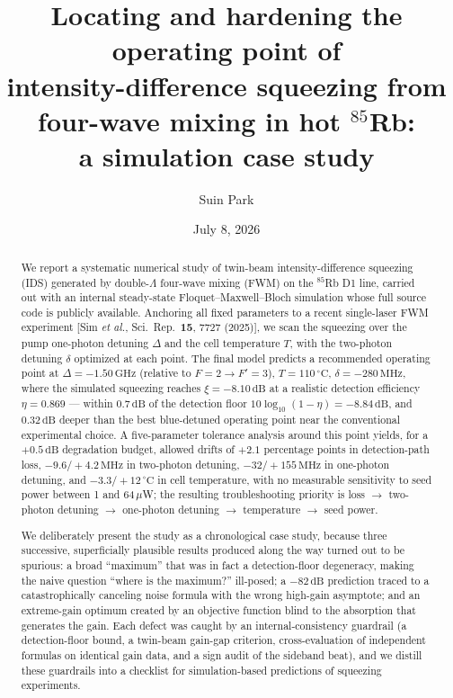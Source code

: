 \documentclass[11pt,a4paper]{article}
\title{\textbf{Locating and hardening the operating point of\\
intensity-difference squeezing from four-wave mixing in hot $^{85}$Rb:\\
a simulation case study}}
\author{Suin Park}
\date{July 8, 2026}
\newcommand{\dB}{\,\mathrm{dB}}
\newcommand{\GHz}{\,\mathrm{GHz}}
\newcommand{\MHz}{\,\mathrm{MHz}}
\newcommand{\degC}{\,^{\circ}\mathrm{C}}
\newcommand{\Rb}{$^{85}$Rb}
\begin{document}
\maketitle

\begin{abstract}
\noindent
We report a systematic numerical study of twin-beam intensity-difference
squeezing (IDS) generated by double-$\Lambda$ four-wave mixing (FWM) on the
\Rb{} D1 line, carried out with an internal steady-state Floquet--Maxwell--Bloch
simulation whose full source code is publicly available.
Anchoring all fixed parameters to a recent single-laser FWM experiment
[Sim \emph{et al.}, Sci.\ Rep.\ \textbf{15}, 7727 (2025)], we scan the
squeezing over the pump one-photon detuning $\Delta$ and the cell temperature
$T$, with the two-photon detuning $\delta$ optimized at each point. The final
model predicts a recommended operating point at
$\Delta=-1.50\GHz$ (relative to $F{=}2\to F'{=}3$), $T=110\degC$,
$\delta=-280\MHz$, where the simulated squeezing reaches $\xi=-8.10\dB$ at a
realistic detection efficiency $\eta=0.869$ --- within $0.7\dB$ of the
detection floor $10\log_{10}(1-\eta)=-8.84\dB$, and $0.32\dB$ deeper than the
best blue-detuned operating point near the conventional experimental choice. A
five-parameter tolerance analysis around this point yields, for a
$+0.5\dB$ degradation budget, allowed drifts of $+2.1$ percentage points in
detection-path loss, $-9.6/{+}4.2\MHz$ in two-photon detuning,
$-32/{+}155\MHz$ in one-photon detuning, and $-3.3/{+}12\degC$ in cell
temperature, with no measurable sensitivity to seed power between 1 and
64\,$\mu$W; the resulting troubleshooting priority is
loss $\to$ two-photon detuning $\to$ one-photon detuning $\to$ temperature
$\to$ seed power.

We deliberately present the study as a chronological case study, because
three successive, superficially plausible results produced along the way
turned out to be spurious: a broad ``maximum'' that was in fact a
detection-floor degeneracy, making the naive question ``where is the
maximum?'' ill-posed; a $-82\dB$ prediction traced to a catastrophically
canceling noise formula with the wrong high-gain asymptote; and an
extreme-gain optimum created by an objective function blind to the
absorption that generates the gain. Each defect was
caught by an internal-consistency guardrail (a detection-floor bound, a
twin-beam gain-gap criterion, cross-evaluation of independent formulas on
identical gain data, and a sign audit of the sideband beat), and we distill
these guardrails into a checklist for simulation-based predictions of
squeezing experiments.
\end{abstract}
\end{document}

